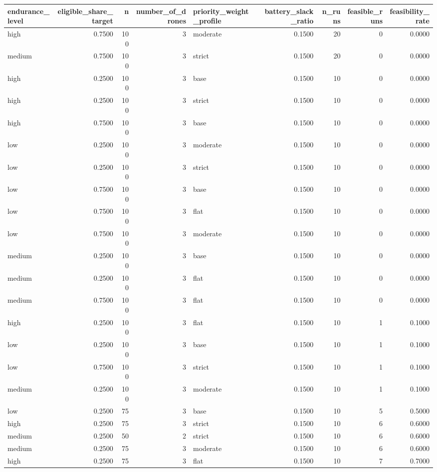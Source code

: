 \begin{tabular}{lrrrlrrrr}
\toprule
endurance_level & eligible_share_target & n & number_of_drones & priority_weight_profile & battery_slack_ratio & n_runs & feasible_runs & feasibility_rate \\
\midrule
high & 0.7500 & 100 & 3 & moderate & 0.1500 & 20 & 0 & 0.0000 \\
medium & 0.7500 & 100 & 3 & strict & 0.1500 & 20 & 0 & 0.0000 \\
high & 0.2500 & 100 & 3 & base & 0.1500 & 10 & 0 & 0.0000 \\
high & 0.2500 & 100 & 3 & strict & 0.1500 & 10 & 0 & 0.0000 \\
high & 0.7500 & 100 & 3 & base & 0.1500 & 10 & 0 & 0.0000 \\
low & 0.2500 & 100 & 3 & moderate & 0.1500 & 10 & 0 & 0.0000 \\
low & 0.2500 & 100 & 3 & strict & 0.1500 & 10 & 0 & 0.0000 \\
low & 0.7500 & 100 & 3 & base & 0.1500 & 10 & 0 & 0.0000 \\
low & 0.7500 & 100 & 3 & flat & 0.1500 & 10 & 0 & 0.0000 \\
low & 0.7500 & 100 & 3 & moderate & 0.1500 & 10 & 0 & 0.0000 \\
medium & 0.2500 & 100 & 3 & base & 0.1500 & 10 & 0 & 0.0000 \\
medium & 0.2500 & 100 & 3 & flat & 0.1500 & 10 & 0 & 0.0000 \\
medium & 0.7500 & 100 & 3 & flat & 0.1500 & 10 & 0 & 0.0000 \\
high & 0.2500 & 100 & 3 & flat & 0.1500 & 10 & 1 & 0.1000 \\
low & 0.2500 & 100 & 3 & base & 0.1500 & 10 & 1 & 0.1000 \\
low & 0.7500 & 100 & 3 & strict & 0.1500 & 10 & 1 & 0.1000 \\
medium & 0.2500 & 100 & 3 & moderate & 0.1500 & 10 & 1 & 0.1000 \\
low & 0.2500 & 75 & 3 & base & 0.1500 & 10 & 5 & 0.5000 \\
high & 0.2500 & 75 & 3 & strict & 0.1500 & 10 & 6 & 0.6000 \\
medium & 0.2500 & 50 & 2 & strict & 0.1500 & 10 & 6 & 0.6000 \\
medium & 0.2500 & 75 & 3 & moderate & 0.1500 & 10 & 6 & 0.6000 \\
high & 0.2500 & 75 & 3 & flat & 0.1500 & 10 & 7 & 0.7000 \\

\end{tabular}
